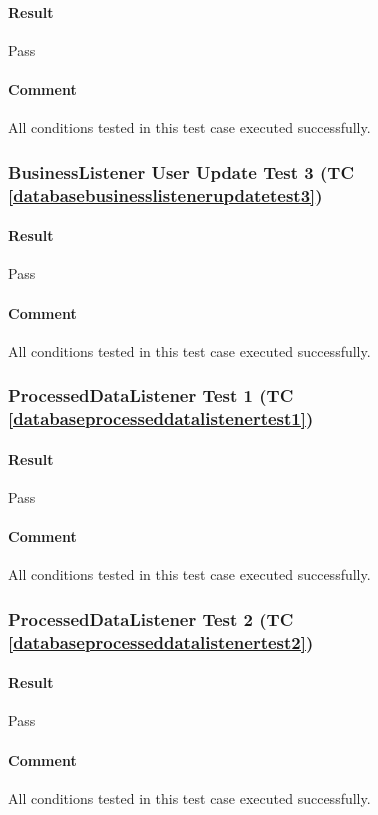 \documentclass[hidelinks,english]{article}
\begin{document}
				\paragraph{Result} Pass
				\paragraph{Comment} All conditions tested in this test case executed successfully.
				
			\subsubsection{BusinessListener User Update Test 3 (TC \ref{databasebusinesslistenerupdatetest3})}
				\paragraph{Result} Pass
				\paragraph{Comment} All conditions tested in this test case executed successfully.
			
			\subsubsection{ProcessedDataListener Test 1 (TC \ref{databaseprocesseddatalistenertest1})}
				\paragraph{Result} Pass
				\paragraph{Comment} All conditions tested in this test case executed successfully.
			
			\subsubsection{ProcessedDataListener Test 2 (TC \ref{databaseprocesseddatalistenertest2})}
				\paragraph{Result} Pass
				\paragraph{Comment} All conditions tested in this test case executed successfully.
			
\end{document}
